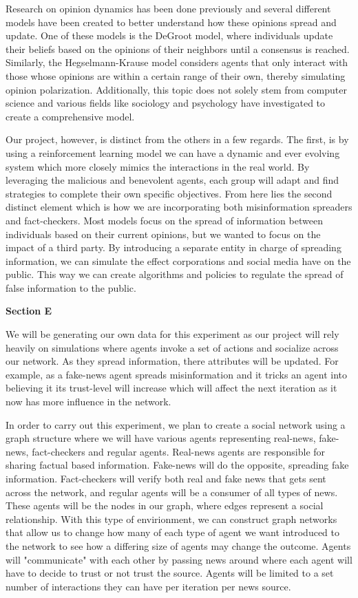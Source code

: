 \documentclass[12pt,twoside]{article}
\begin{document}
Research on opinion dynamics has been done previously and several different models have been created to better understand how these opinions spread and update. One of these models is the DeGroot model, where individuals update their beliefs based on the opinions of their neighbors until a consensus is reached. Similarly, the Hegselmann-Krause model considers agents that only interact with those whose opinions are within a certain range of their own, thereby simulating opinion polarization. Additionally, this topic does not solely stem from computer science and various fields like sociology and psychology have investigated to create a comprehensive model.

Our project, however, is distinct from the others in a few regards. The first, is by using a reinforcement learning model we can have a dynamic and ever evolving system which more closely mimics the interactions in the real world. By leveraging the malicious and benevolent agents, each group will adapt and find strategies to complete their own specific objectives. From here lies the second distinct element which is how we are incorporating both misinformation spreaders and fact-checkers. Most models focus on the spread of information between individuals based on their current opinions, but we wanted to focus on the impact of a third party. By introducing a separate entity in charge of spreading information, we can simulate the effect corporations and social media have on the public. This way we can create algorithms and policies to regulate the spread of false information to the public.

\textbf{Section E}

We will be generating our own data for this experiment as our project will rely heavily on simulations where agents invoke a set of actions and socialize across our network. As they spread information, there attributes will be updated. For example, as a fake-news agent spreads misinformation and it tricks an agent into believing it its trust-level will increase which will affect the next iteration as it now has more influence in the network.

In order to carry out this experiment, we plan to create a social network using a graph structure where we will have various agents representing real-news, fake-news, fact-checkers and regular agents. Real-news agents are responsible for sharing factual based information. Fake-news will do the opposite, spreading fake information. Fact-checkers will verify both real and fake news that gets sent across the network, and regular agents will be a consumer of all types of news. These agents will be the nodes in our graph, where edges represent a social relationship. With this type of envirionment, we can construct graph networks that allow us to change how many of each type of agent we want introduced to the network to see how a differing size of agents may change the outcome. Agents will "communicate" with each other by passing news around where each agent will have to decide to trust or not trust the source. Agents will be limited to a set number of interactions they can have per iteration per news source.
\end{document}

